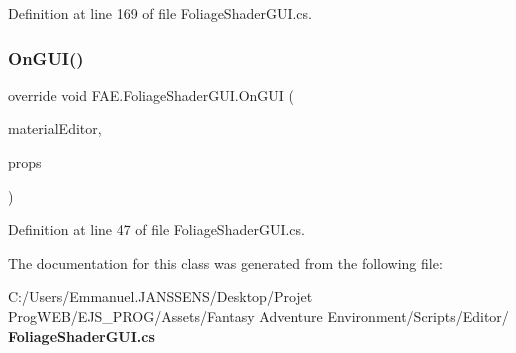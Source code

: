 Definition at line 169 of file Foliage\+Shader\+G\+U\+I.\+cs.

\mbox{\label{class_f_a_e_1_1_foliage_shader_g_u_i_a517c9ec3e077442ad317bc22ede00544}} 
\subsubsection{On\+G\+U\+I()}
{\footnotesize\ttfamily override void F\+A\+E.\+Foliage\+Shader\+G\+U\+I.\+On\+G\+UI (\begin{DoxyParamCaption}\item[{Material\+Editor}]{material\+Editor,  }\item[{Material\+Property [$\,$]}]{props }\end{DoxyParamCaption})}



Definition at line 47 of file Foliage\+Shader\+G\+U\+I.\+cs.



The documentation for this class was generated from the following file\+:\begin{DoxyCompactItemize}
\item 
C\+:/\+Users/\+Emmanuel.\+J\+A\+N\+S\+S\+E\+N\+S/\+Desktop/\+Projet Prog\+W\+E\+B/\+E\+J\+S\+\_\+\+P\+R\+O\+G/\+Assets/\+Fantasy Adventure Environment/\+Scripts/\+Editor/\textbf{ Foliage\+Shader\+G\+U\+I.\+cs}\end{DoxyCompactItemize}
